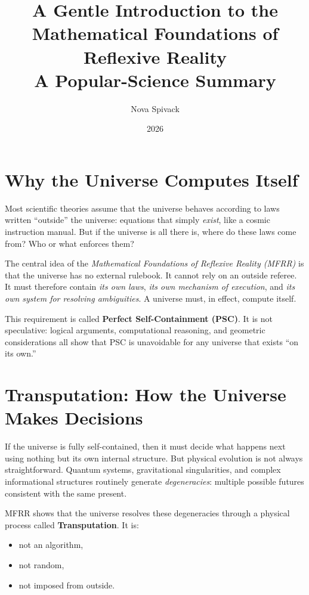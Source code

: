 \documentclass[11pt]{article}
\title{\textbf{A Gentle Introduction to the Mathematical Foundations of Reflexive Reality}\\[4pt]
\large A Popular-Science Summary}
\author{Nova Spivack}
\date{2026}
\begin{document}
\maketitle
\NovaZenodoAfterTitle

\section*{Why the Universe Computes Itself}

Most scientific theories assume that the universe behaves according to laws written ``outside''
the universe: equations that simply \emph{exist}, like a cosmic instruction manual. But if the
universe is all there is, where do these laws come from? Who or what enforces them?

The central idea of the \emph{Mathematical Foundations of Reflexive Reality (MFRR)} is that
the universe has no external rulebook. It cannot rely on an outside referee. It must therefore
contain \emph{its own laws}, \emph{its own mechanism of execution}, and \emph{its own system
for resolving ambiguities}. A universe must, in effect, compute itself.

This requirement is called \textbf{Perfect Self-Containment (PSC)}. It is not speculative:
logical arguments, computational reasoning, and geometric considerations all show that PSC is
unavoidable for any universe that exists ``on its own.''

\section*{Transputation: How the Universe Makes Decisions}

If the universe is fully self-contained, then it must decide what happens next using nothing
but its own internal structure. But physical evolution is not always straightforward. Quantum
systems, gravitational singularities, and complex informational structures routinely generate
\emph{degeneracies}: multiple possible futures consistent with the same present.

MFRR shows that the universe resolves these degeneracies through a physical process called
\textbf{Transputation}. It is:

\begin{itemize}
    \item not an algorithm,
    \item not random,
    \item not imposed from outside.
\end{itemize}
\end{document}

